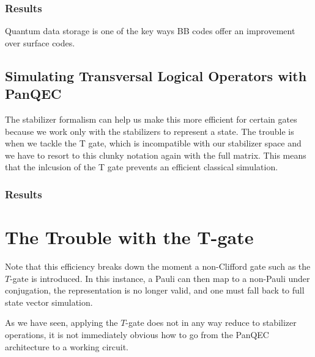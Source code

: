 
\subsection{Results}


Quantum data storage is one of the key ways BB codes offer an improvement over surface codes.


\section{Simulating Transversal Logical Operators with PanQEC}
The stabilizer formalism can help us make this more efficient for certain gates because we work only with the stabilizers to represent a state. The trouble is when we tackle the T gate, which is incompatible with our stabilizer space and we have to resort to this clunky notation again with the full matrix. This means that the inlcusion of the T gate prevents an efficient classical simulation.


\subsection{Results}


\chapter{The Trouble with the T-gate}\label{chap:t_gate}
Note that this efficiency breaks down the moment a non-Clifford gate such as the $T$-gate is introduced. In this instance, a Pauli can then map to a non-Pauli under conjugation, the representation is no longer valid, and one must fall back to full state vector simulation.

As we have seen, applying the $T$-gate does not in any way reduce to stabilizer operations, it is not immediately obvious how to go from the PanQEC architecture to a working circuit.

